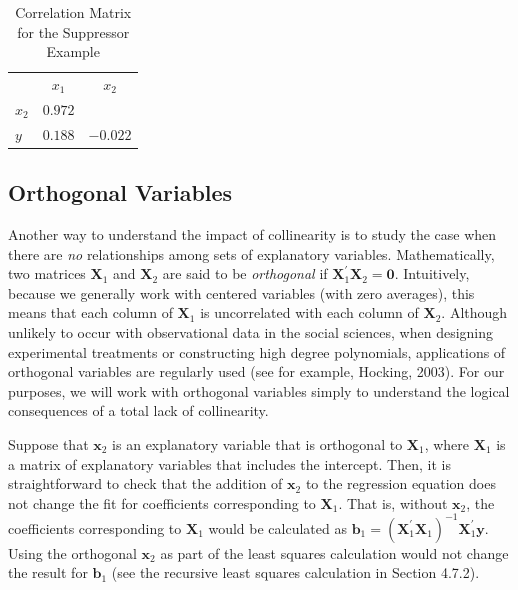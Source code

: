 \begin{table}[h]

\caption{\label{T5:Suppress} Correlation Matrix for the Suppressor
Example}

\begin{tabular}{ccc}
\hline
& $x_1$ & $x_2$ \\
\multicolumn{1}{l}{$x_2$} & $0.972$ &  \\
\multicolumn{1}{l}{$y$} & $0.188$ & $-0.022$ \\ \hline
\end{tabular}
\linetjed {}
\end{table}


\subsection{Orthogonal Variables}\label{S5:Orthogonal}
Another way to understand the impact of collinearity is to study the
case when there are \emph{no} relationships among sets of
explanatory variables. Mathematically, two matrices $\mathbf{X}_1$
and $\mathbf{X}_2$ are said to be \emph{orthogonal} if
$\mathbf{X}_1^{\prime}\mathbf{X}_2= \mathbf{0}.$ Intuitively,
because we generally work with centered variables (with zero
averages), this means that each column of $\mathbf{X}_1$ is
uncorrelated with each column of $\mathbf{X}_2$. Although unlikely
to occur with observational data in the social sciences, when
designing experimental treatments or constructing high degree
polynomials, applications of orthogonal variables are regularly used
(see for example, Hocking, 2003). For our purposes, we will work
with orthogonal variables simply to understand the logical
consequences of a total lack of collinearity.

Suppose that $\mathbf{x}_2$ is an explanatory variable that is
orthogonal to $\mathbf{X}_1$, where $\mathbf{X}_1$ is a matrix of
explanatory variables that includes the intercept. Then, it is
straightforward to check that the addition of $\mathbf{x}_2$ to the
regression equation does not change the fit for coefficients
corresponding to $\mathbf{X}_1$. That is, without $\mathbf{x}_2$,
the coefficients corresponding to $\mathbf{X}_1$ would be calculated
as $\mathbf{b}_1= \left(\mathbf{X}_1^{\prime} \mathbf{X}_1
\right)^{-1} \mathbf{X}_1^{\prime} \mathbf{y}.$ Using the orthogonal
$\mathbf{x}_2$ as part of the least squares calculation would not
change the result for $\mathbf{b}_1$ (see the recursive least
squares calculation in Section 4.7.2).

